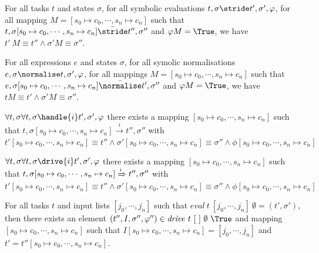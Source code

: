 \begin{lemma}
  \label{lem:soundeval}

  For all tasks $t$ and states $\sigma$,
  for all symbolic evaluations $t,\sigma\stride t',\sigma',\phi$,
  for all mapping $M=[s_0\mapsto c_0,\cdots,s_n\mapsto c_n]$
  such that $t,\sigma [s_0\mapsto c_0,\cdots,s_n\mapsto c_n] \bar{\stride}t'',\sigma''$ and $\phi M = \True$,
  we have $t'\ M \equiv t'' \wedge \sigma' M \equiv \sigma''$.

\end{lemma}

\begin{lemma}
  \label{lem:soundnorm}

  For all expressions $e$ and states $\sigma$,
  for all symolic normalisations $e,\sigma\normalise t,\sigma',\phi$,
  for all mappings $M=[s_0\mapsto c_0,\cdots,s_n\mapsto c_n]$
  such that $e,\sigma [s_0\mapsto c_0,\cdots,s_n\mapsto c_n] \bar{\normalise}t',\sigma''$ and $\phi M =\True$,
  we have $t M \equiv t' \wedge \sigma' M \equiv \sigma''$.
  
\end{lemma}

\begin{lemma}
  $\forall t,\sigma \forall t,\sigma\handle{i} t',\sigma',\phi$
  there exists a mapping $[s_0\mapsto c_0,\cdots,s_n\mapsto c_n]$
  such that $t,\sigma [s_0\mapsto c_0,\cdots,s_n\mapsto c_n] \xrightarrow[]{i} t'',\sigma''$
  with $t'[s_0\mapsto c_0,\cdots,s_n\mapsto c_n] \equiv t'' \wedge \sigma' [s_0\mapsto c_0,\cdots,s_n\mapsto c_n] \equiv \sigma'' \wedge \phi [s_0\mapsto c_0,\cdots,s_n\mapsto c_n]$
\end{lemma}


\begin{lemma}
  $\forall t,\sigma \forall t,\sigma\drive{i} t',\sigma',\phi$
  there exists a mapping $[s_0\mapsto c_0,\cdots,s_n\mapsto c_n]$
  such that $t,\sigma [s_0\mapsto c_0,\cdots,s_n\mapsto c_n] \xRightarrow[]{i} t'',\sigma''$
  with $t'[s_0\mapsto c_0,\cdots,s_n\mapsto c_n] \equiv t'' \wedge \sigma' [s_0\mapsto c_0,\cdots,s_n\mapsto c_n] \equiv \sigma'' \wedge \phi [s_0\mapsto c_0,\cdots,s_n\mapsto c_n]$
\end{lemma}


\begin{theorem}
For all tasks $t$ and input lists $[j_0,\cdots,j_n]$ such that $\mathit{eval}\ t\ [j_0,\cdots,j_n]\ \emptyset = (t',\sigma')$,
then there exists an element $(t'',I,\sigma'',\phi'')\in \mathit{drive}\ t\ [\ ]\ \emptyset\ \True$ and mapping $[s_0\mapsto c_0,\cdots,s_n\mapsto c_n]$ such that
$I[s_0\mapsto c_0,\cdots,s_n\mapsto c_n]=[j_0,\cdots,j_n]$ and $t'=t''[s_0\mapsto c_0,\cdots,s_n\mapsto c_n]$.
  \label{thm:complete}
\end{theorem}


